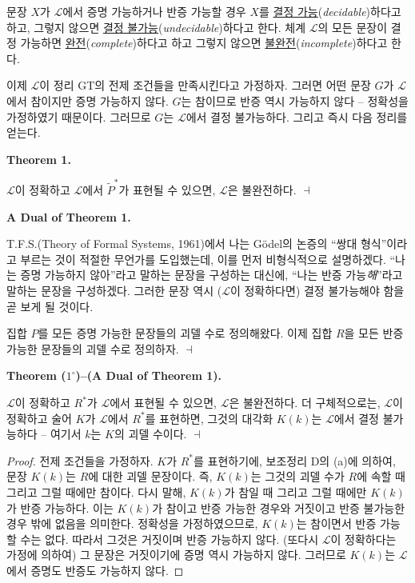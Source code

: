 \documentclass[12pt]{paper}
\newenvironment{context}[1][]
{ \noindent \textbf{{#1}.}
}
{ \hfill $ \dashv $ }
\begin{document}
문장 $X$가 $\mathcal{L}$에서 증명 가능하거나 반증 가능할 경우 $X$를 \underline{결정 가능}(\textit{decidable})하다고 하고,
그렇지 않으면 \underline{결정 불가능}(\textit{undecidable})하다고 한다.
체계 $\mathcal{L}$의 모든 문장이 결정 가능하면 \underline{완전}(\textit{complete})하다고 하고 그렇지 않으면 \underline{불완전}(\textit{incomplete})하다고 한다.

이제 $\mathcal{L}$이 정리 GT의 전제 조건들을 만족시킨다고 가정하자.
그러면 어떤 문장 $G$가 $\mathcal{L}$에서 참이지만 증명 가능하지 않다.
$G$는 참이므로 반증 역시 가능하지 않다 --
정확성을 가정하였기 때문이다.
그러므로 $G$는 $\mathcal{L}$에서 결정 불가능하다.
그리고 즉시 다음 정리를 얻는다.

\begin{context}[Theorem 1]
$\mathcal{L}$이 정확하고 $\mathcal{L}$에서 $\widetilde{P}^{*}$가 표현될 수 있으면,
$\mathcal{L}$은 불완전하다.
\end{context}

\begin{context}[A Dual of Theorem 1]
T.F.S.(Theory of Formal Systems, 1961)에서 나는 G\"odel의 논증의 ``쌍대 형식''이라고 부르는 것이 적절한 무언가를 도입했는데,
이를 먼저 비형식적으로 설명하겠다.
``나는 증명 가능하지 않아''라고 말하는 문장을 구성하는 대신에,
``나는 반증 가능\textit{해}''라고 말하는 문장을 구성하겠다.
그러한 문장 역시 ($\mathcal{L}$이 정확하다면) 결정 불가능해야 함을 곧 보게 될 것이다.

집합 $P$를 모든 증명 가능한 문장들의 괴델 수로 정의해왔다.
이제 집합 $R$을 모든 반증 가능한 문장들의 괴델 수로 정의하자.
\end{context}

\begin{context}[Theorem ($1^{\circ}$)--(A Dual of Theorem 1)]
$\mathcal{L}$이 정확하고 $R^{*}$가 $\mathcal{L}$에서 표현될 수 있으면,
$\mathcal{L}$은 불완전하다.
더 구체적으로는, $\mathcal{L}$이 정확하고 술어 $K$가 $\mathcal{L}$에서 $R^{*}$를 표현하면,
그것의 대각화 $K \left( k \right)$는 $\mathcal{L}$에서 결정 불가능하다 --
여기서 $k$는 $K$의 괴델 수이다.
\end{context}

\begin{proof}
전제 조건들을 가정하자.
$K$가 $R^{*}$를 표현하기에, 보조정리 D의 (a)에 의하여,
문장 $K \left( k \right)$는 $R$에 대한 괴델 문장이다.
즉, $K \left( k \right)$는 그것의 괴델 수가 $R$에 속할 때 그리고 그럴 때에만 참이다.
다시 말해, $K \left( k \right)$가 참일 때 그리고 그럴 때에만 $K \left( k \right)$가 반증 가능하다.
이는 $K \left( k \right)$가 참이고 반증 가능한 경우와 거짓이고 반증 불가능한 경우 밖에 없음을 의미한다.
정확성을 가정하였으므로, $K \left( k \right)$는 참이면서 반증 가능할 수는 없다.
따라서 그것은 거짓이며 반증 가능하지 않다.
(또다시 $\mathcal{L}$이 정확하다는 가정에 의하여) 그 문장은 거짓이기에 증명 역시 가능하지 않다.
그러므로 $K \left( k \right)$는 $\mathcal{L}$에서 증명도 반증도 가능하지 않다.
\end{proof}
\end{document}

